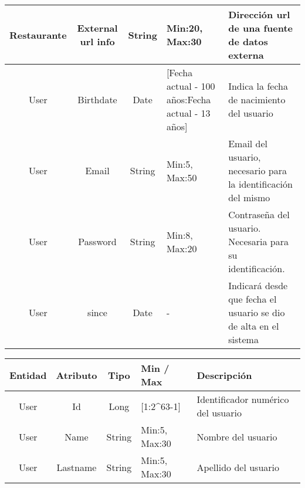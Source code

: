 \begin{landscape}
\begin{table}[h]
\begin{center}
\begin{tabular}{| c | c | c | p{3cm} | p{12cm}|}
				\midrule
				Restaurante & External url info & String  & Min:20, Max:30                                     & Dirección url de una fuente de datos       		    externa                                                                                  \\
				\midrule
				User        & Birthdate         & Date    & [Fecha actual - 100 años:Fecha actual - 13 años] & Indica la fecha de nacimiento del usuario                                                                                                  \\
				\midrule
				User        & Email             & String  & Min:5, Max:50                                      & Email del usuario, necesario para la identificación del mismo                                                                             \\
				\midrule
				User        & Password          & String  & Min:8, Max:20                                      & Contraseña del usuario. Necesaria para su identificación.                                                                                \\
				\midrule
				User        & since             & Date    & -                                                  & Indicará desde que fecha el usuario se dio de alta en el sistema                                                                          \\
				\bottomrule
			\end{tabular}
		\end{center}
	\end{table}
	\newpage
	\begin{table}
		\begin{center}
			\begin{tabular}{| c | c | c | p{3cm} | p{12cm}|} 
				\toprule
				Entidad  & Atributo    & Tipo   & Min / Max       & Descripción                                                                           \\
				\midrule
				User     & Id          & Long   & [1:2\^{ }63-1]  & Identificador numérico del usuario                                                    \\
				\midrule
				User     & Name        & String & Min:5, Max:30   & Nombre del usuario                                                                     \\
				\midrule
				User     & Lastname    & String & Min:5, Max:30   & Apellido del usuario                                                                   \\

\end{tabular}
\end{center}
\end{table}
\end{landscape}

